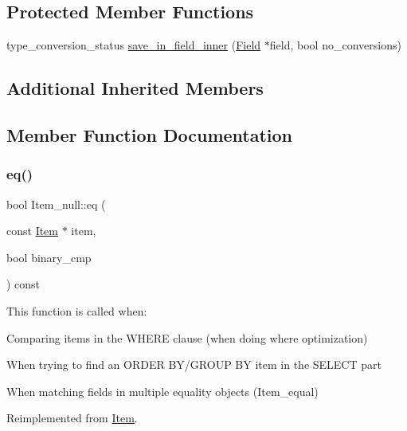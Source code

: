 \subsection*{Protected Member Functions}
\begin{DoxyCompactItemize}
\item 
type\+\_\+conversion\+\_\+status \mbox{\hyperlink{classItem__null_af63975b9d3bea7f7a09bcaf0dc5da860}{save\+\_\+in\+\_\+field\+\_\+inner}} (\mbox{\hyperlink{classField}{Field}} $\ast$field, bool no\+\_\+conversions)
\end{DoxyCompactItemize}
\subsection*{Additional Inherited Members}


\subsection{Member Function Documentation}
\mbox{\label{classItem__null_acf71d2194641e39c7aa1d9863ddd4fd7}} 
\subsubsection{\texorpdfstring{eq()}{eq()}}
{\footnotesize\ttfamily bool Item\+\_\+null\+::eq (\begin{DoxyParamCaption}\item[{const \mbox{\hyperlink{classItem}{Item}} $\ast$}]{item,  }\item[{bool}]{binary\+\_\+cmp }\end{DoxyParamCaption}) const\hspace{0.3cm}{\ttfamily [virtual]}}

This function is called when\+:
\begin{DoxyItemize}
\item Comparing items in the W\+H\+E\+RE clause (when doing where optimization)
\item When trying to find an O\+R\+D\+ER B\+Y/\+G\+R\+O\+UP BY item in the S\+E\+L\+E\+CT part
\item When matching fields in multiple equality objects (Item\+\_\+equal) 
\end{DoxyItemize}

Reimplemented from \mbox{\hyperlink{classItem_af0957bbdb9a256de0cd29f1adcae28be}{Item}}.


